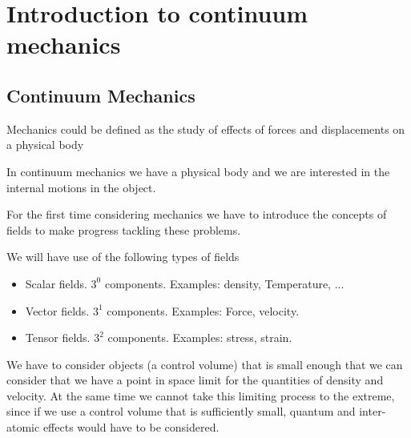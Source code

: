 % 
% 
% 
% 
% 
% 
% 
% 
% 
% 
% 
% 

\chapter{Introduction to continuum mechanics}
\section{Continuum Mechanics}

Mechanics could be defined as the study of effects of forces and displacements on a physical body


In continuum mechanics we have a physical body and we are interested in the internal motions in the object.


For the first time considering mechanics we have to introduce the concepts of fields to make progress tackling these problems.

We will have use of the following types of fields

\begin{itemize}
\item Scalar fields.  $3^0$ components.  Examples: density, Temperature, ...
\item Vector fields.  $3^1$ components.  Examples: Force, velocity.
\item Tensor fields.  $3^2$ components.  Examples: stress, strain.
\end{itemize}

We have to consider objects (a control volume) that is small enough that we can consider that we have a point in space limit for the quantities of density and velocity.  At the same time we cannot take this limiting process to the extreme, since if we use a control volume that is sufficiently small, quantum and inter-atomic effects would have to be considered.

